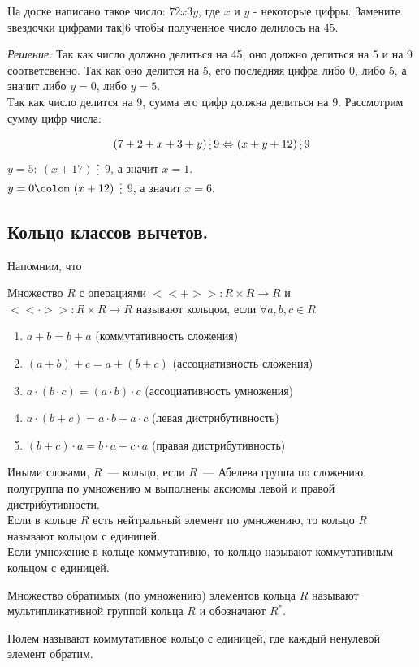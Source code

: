 \documentclass[11pt]{article}
\begin{document}
\begin{example}
	На доске написано  такое число: $72x3y$, где $x$ и $y$ - некоторые цифры. Замените звездочки цифрами так]6 чтобы полученное число делилось на 45.
\end{example}
\textit{Решение:}
Так как число должно делиться на 45, оно должно делиться на 5 и на 9 соответсвенно.
Так как оно делится на 5, его последняя цифра либо 0, либо 5, а значит либо $y = 0$, либо $y = 5$. \\
Так как число делится на 9, сумма его цифр должна делиться на 9. Рассмотрим сумму цифр числа:
\[ (7 + 2 + x + 3 + y) \divisible 9 \Leftrightarrow (x + y + 12) \divisible 9\]
$y = 5\colon \ (x + 17)$ $\divisible$ $9$, а значит $x = 1$.\\
$y = 0\colom \ (x + 12)$ $\divisible$ $9$, а значит $x = 6$.\\

\subsection{Кольцо классов вычетов.}
Напомним, что
\begin{definition}
	Множество $R$ с операциями $<<+>>\colon R \times R \to R$ и $<<\cdot>>\colon R \times R \to R$  называют кольцом, если
	$\forall a, b, c \in R$
	\begin{enumerate}
	    \item $a + b = b + a$ (коммутативность сложения)

		\item $(a + b) + c = a + (b + c)$ (ассоциативность сложения)

		\item $a \cdot (b \cdot c) = (a \cdot b) \cdot c$ (ассоциативность умножения)

		\item $a \cdot (b + c) = a \cdot b + a \cdot c$ (левая дистрибутивность)

		\item $(b + c) \cdot a = b \cdot a + c \cdot a$ (правая дистрибутивность)
	\end{enumerate}
	Иными словами, $R$~--- кольцо, если $R$~--- Абелева группа по сложению, полугруппа по умножению м выполнены аксиомы левой и правой
	дистрибутивности. \\
	Если в кольце $R$ есть нейтральный элемент по умножению, то кольцо $R$ называют кольцом с единицей. \\
	Если умножение в кольце коммутативно, то кольцо называют коммутативным кольцом с единицей. \\
\end{definition}
\begin{definition}
	Множество обратимых (по умножению) элементов кольца $R$ называют мультипликативной группой кольца $R$ и обозначают $R^{*}$.
\end{definition}
\begin{definition}
	Полем называют коммутативное кольцо с единицей, где каждый ненулевой элемент обратим.
\end{definition}
\end{document}

